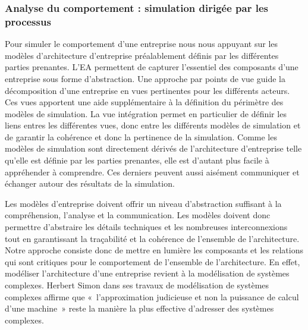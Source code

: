 \subsubsection{Analyse du comportement : simulation dirigée par les processus
}

Pour simuler le comportement d'une entreprise nous nous appuyant sur les modèles
d'architecture d'entreprise préalablement définis par les différentes parties
prenantes. L'EA permettent de capturer l'essentiel des composants d'une
entreprise sous forme d'abstraction. Une approche par points de vue guide la
décomposition d'une entreprise en vues pertinentes pour les différents acteurs.
Ces vues apportent une aide supplémentaire à la définition du périmètre des
modèles de simulation. La vue intégration permet en particulier de définir les
liens entres les différentes vues, donc entre les différents modèles de
simulation et de garantir la cohérence et donc la pertinence de la simulation.
Comme les modèles de simulation sont directement dérivés de l'architecture
d'entreprise telle qu'elle est définie par les parties prenantes, elle est
d'autant plus facile à appréhender à comprendre. Ces derniers peuvent aussi
aisément communiquer et échanger autour des résultats de la simulation.

Les modèles d'entreprise doivent offrir un niveau d'abstraction suffisant à la
compréhension, l'analyse et la communication. Les modèles doivent donc permettre
d'abstraire les détails techniques et les nombreuses interconnexions tout en
garantissant la traçabilité et la cohérence de l'ensemble de l'architecture.
Notre approche consiste donc de mettre en lumière les composants et les
relations qui sont critiques pour le comportement de l'ensemble de
l'architecture. En effet, modéliser l'architecture d'une entreprise revient à la
modélisation de systèmes complexes. Herbert Simon \cite{simon1990prediction}
dans ses travaux de modélisation de systèmes complexes affirme que
«~l'approximation judicieuse et non la puissance de calcul d'une machine~» reste
la manière la plus effective d'adresser des systèmes complexes.

